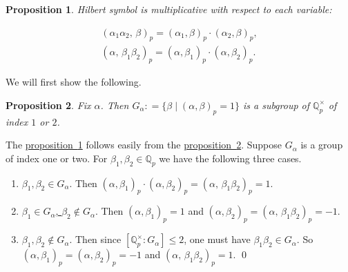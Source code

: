 \documentclass{article}
\newcommand{\dfn}{\mathrel{\mathop:}=}
\newcommand{\QQ}{\mathbb{Q}}
\newcommand{\refref}[2]{\hyperref[#2]{#1~\ref*{#2}}}
\theoremstyle{myplain}
\newtheorem{proposition}{Proposition}[section]
\theoremstyle{mydefinition}
\begin{document}
\begin{proposition}\label{proposition:hilb-multiplicativity-1}
  Hilbert symbol is multiplicative with respect to each variable:

  \begin{gather*}
    (\alpha_1 \alpha_2,\, \beta)_p = (\alpha_1, \beta)_p \cdot (\alpha_2, \beta)_p,\\
    (\alpha,\, \beta_1 \beta_2)_p = (\alpha, \beta_1)_p \cdot (\alpha, \beta_2)_p.
  \end{gather*}
\end{proposition}

We will first show the following.

\begin{proposition}\label{proposition:hilb-multiplicativity-2}
  Fix $\alpha$. Then $G_\alpha \dfn \{ \beta \mid (\alpha,\beta)_p = 1 \}$ is a
  subgroup of $\QQ_p^\times$ of index $1$ or $2$.
\end{proposition}

The \refref{proposition}{proposition:hilb-multiplicativity-1} follows easily
from the \refref{proposition}{proposition:hilb-multiplicativity-2}. Suppose
$G_\alpha$ is a group of index one or two. For $\beta_1, \beta_2 \in \QQ_p$ we
have the following three cases.

\begin{enumerate}
\item \underline{$\beta_1, \beta_2 \in G_\alpha$}. Then
  $(\alpha,\beta_1)_p \cdot (\alpha,\beta_2)_p = (\alpha,\, \beta_1 \beta_2)_p = 1$.

\item \underline{$\beta_1 \in G_\alpha$, $\beta_2 \notin G_\alpha$}. Then
  $(\alpha,\beta_1)_p = 1$ and
  $(\alpha,\beta_2)_p = (\alpha,\, \beta_1 \beta_2)_p = -1$.

\item \underline{$\beta_1, \beta_2 \notin G_\alpha$}. Then since
  $[\QQ_p^\times : G_\alpha] \le 2$, one must have
  $\beta_1\beta_2 \in G_\alpha$. So
  $(\alpha,\beta_1)_p = (\alpha,\beta_2)_p = -1$ and
  $(\alpha,\, \beta_1 \beta_2)_p = 1$. \qed
\end{enumerate}
\end{document}
